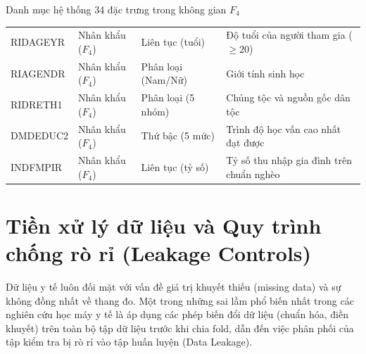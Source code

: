 \begin{table}{Danh mục hệ thống 34 đặc trưng trong không gian $F_4$}
\begin{tabularx}{\textwidth}{p{2.5cm} p{2.2cm} p{2.5cm} X}
\midrule
RIDAGEYR & Nhân khẩu ($F_4$) & Liên tục (tuổi) & Độ tuổi của người tham gia ($\ge 20$) \\
RIAGENDR & Nhân khẩu ($F_4$) & Phân loại (Nam/Nữ) & Giới tính sinh học \\
RIDRETH1 & Nhân khẩu ($F_4$) & Phân loại (5 nhóm) & Chủng tộc và nguồn gốc dân tộc \\
DMDEDUC2 & Nhân khẩu ($F_4$) & Thứ bậc (5 mức) & Trình độ học vấn cao nhất đạt được \\
INDFMPIR & Nhân khẩu ($F_4$) & Liên tục (tỷ số) & Tỷ số thu nhập gia đình trên chuẩn nghèo \\
\bottomrule
\end{tabularx}
\end{table}

\section{Tiền xử lý dữ liệu và Quy trình chống rò rỉ (Leakage Controls)}
\label{sec:tien-xu-ly}

Dữ liệu y tế luôn đối mặt với vấn đề giá trị khuyết thiếu (missing data) và sự không đồng nhất về thang đo. Một trong những sai lầm phổ biến nhất trong các nghiên cứu học máy y tế là áp dụng các phép biến đổi dữ liệu (chuẩn hóa, điền khuyết) trên toàn bộ tập dữ liệu trước khi chia fold, dẫn đến việc phân phối của tập kiểm tra bị rò rỉ vào tập huấn luyện (Data Leakage).

